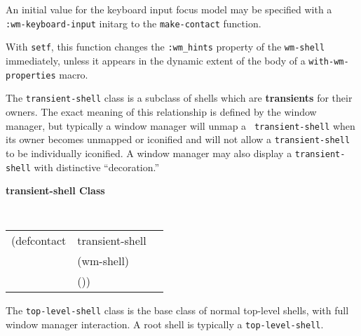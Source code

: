 \documentclass[twoside]{book}
\begin{document}
\begin{sloppy}
\begin{flushright}
{An initial value for the keyboard input focus model may be specified with a {\tt
:wm-keyboard-input} initarg to the {\tt make-contact} function.

With {\tt setf}, this function changes the {\tt :wm\_hints} property of
the {\tt wm-shell} immediately, unless it appears in the dynamic extent of the
body of a {\tt with-wm-properties} macro.

}\end{flushright}




The {\tt transient-shell} class is
a subclass of shells which are {\bf transients}
for
their owners. The exact meaning of this relationship is defined by the
window manager, but typically a window manager will unmap a {\tt
transient-shell} when its owner becomes unmapped or iconified and will
not allow a {\tt transient-shell} to be individually iconified. A window
manager may also display a {\tt transient-shell} with distinctive
``decoration.''

{\samepage 
{\large {\bf transient-shell \hfill Class}} 
\begin{flushright} \parbox[t]{6.125in}{
\tt
\begin{tabular}{lll}
\raggedright
(defcontact &transient-shell \\
& (wm-shell)\\
&  ())
\end{tabular}
\rm

}\end{flushright}}
 


The {\tt top-level-shell} class is the base class of normal top-level
shells, with full window manager interaction. A root shell is typically
a {\tt top-level-shell}.


\end{sloppy}
\end{document}
